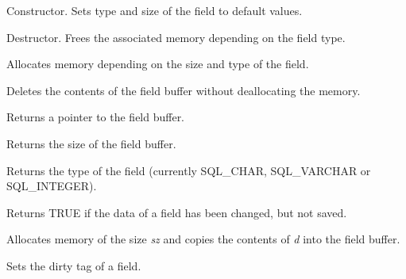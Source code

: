 

Constructor. Sets type and size of the field to default values.
  


Destructor. Frees the associated memory depending on the field type.



Allocates memory depending on the size and type of the field.



Deletes the contents of the field buffer without deallocating the memory.



Returns a pointer to the field buffer.



Returns the size of the field buffer.



Returns the type of the field (currently SQL\_CHAR, SQL\_VARCHAR or SQL\_INTEGER).
 


Returns TRUE if the data of a field has been changed, but not saved.



Allocates memory of the size {\it sz} and copies the contents of {\it d} into the
field buffer.
  


Sets the dirty tag of a field.

